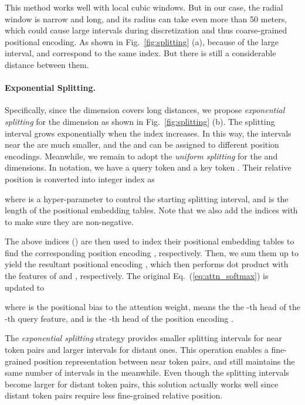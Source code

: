 \documentclass[10pt,twocolumn,letterpaper]{article}
\begin{document}
This method works well with local cubic windows. But in our case, the radial window is narrow and long, and its radius  can take even more than 50 meters, which could cause large intervals during discretization and thus coarse-grained positional encoding. As shown in Fig.~\ref{fig:splitting} (a), because of the large interval,  and  correspond to the same index. But there is still a considerable distance between them.

\paragraph{Exponential Splitting.} Specifically, since the  dimension covers long distances, we propose \textit{exponential splitting} for the  dimension as shown in Fig.~\ref{fig:splitting} (b). The splitting interval grows exponentially when the index increases. In this way, the intervals near the  are much smaller, and the  and  can be assigned to different position encodings. Meanwhile, we remain to adopt the \textit{uniform splitting} for the  and  dimensions. In notation, we have a query token  and a key token . Their relative position  is converted into integer index  as



where  is a hyper-parameter to control the starting splitting interval, and  is the length of the positional embedding tables. Note that we also add the indices with  to make sure they are non-negative.

The above indices () are then used to index their positional embedding tables  to find the corresponding position encoding , respectively. Then, we sum them up to yield the resultant positional encoding , which then performs dot product with the features of  and , respectively. The original Eq.~(\ref{eq:attn_softmax}) is updated to

where  is the positional bias to the attention weight,  means the the -th head of the -th query feature, and  is the -th head of the position encoding .

The \textit{exponential splitting} strategy provides smaller splitting intervals for near token pairs and larger intervals for distant ones. This operation enables a fine-grained position representation between near token pairs, and still maintains the same number of intervals in the meanwhile. Even though the splitting intervals become larger for distant token pairs, this solution actually works well since distant token pairs require less fine-grained relative position.
\end{document}
